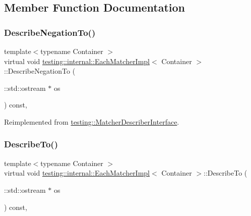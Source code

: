 \subsection{Member Function Documentation}
\mbox{\label{classtesting_1_1internal_1_1_each_matcher_impl_a5be5bbd61f7a350fcbe30deea4c2a0c6}} 
\subsubsection{\texorpdfstring{Describe\+Negation\+To()}{DescribeNegationTo()}}
{\footnotesize\ttfamily template$<$typename Container $>$ \\
virtual void \hyperlink{classtesting_1_1internal_1_1_each_matcher_impl}{testing\+::internal\+::\+Each\+Matcher\+Impl}$<$ Container $>$\+::Describe\+Negation\+To (\begin{DoxyParamCaption}\item[{\+::std\+::ostream $\ast$}]{os }\end{DoxyParamCaption}) const\hspace{0.3cm}{\ttfamily [inline]}, {\ttfamily [virtual]}}



Reimplemented from \hyperlink{classtesting_1_1_matcher_describer_interface_a2071afbc47097c4d1c0064275af34db0}{testing\+::\+Matcher\+Describer\+Interface}.

\mbox{\label{classtesting_1_1internal_1_1_each_matcher_impl_a605e1c800c74701a773205ec050cd574}} 
\subsubsection{\texorpdfstring{Describe\+To()}{DescribeTo()}}
{\footnotesize\ttfamily template$<$typename Container $>$ \\
virtual void \hyperlink{classtesting_1_1internal_1_1_each_matcher_impl}{testing\+::internal\+::\+Each\+Matcher\+Impl}$<$ Container $>$\+::Describe\+To (\begin{DoxyParamCaption}\item[{\+::std\+::ostream $\ast$}]{os }\end{DoxyParamCaption}) const\hspace{0.3cm}{\ttfamily [inline]}, {\ttfamily [virtual]}}



